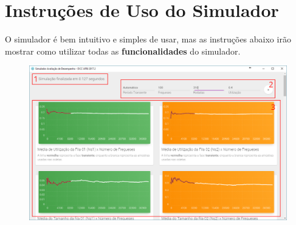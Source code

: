 \documentclass[a4paper,12pt]{report}
\begin{document}
\chapter{Instruções de Uso do Simulador}

O simulador é bem intuitivo e simples de usar, mas as instruções abaixo irão mostrar como utilizar todas as \textbf{funcionalidades} do simulador.

\vspace{5mm}

\begin{figure}[H]
\includegraphics[width=1\textwidth]{./graficos/instructions/SimADViewInst.png}
\vspace{-15mm}
\end{figure}
\end{document}
